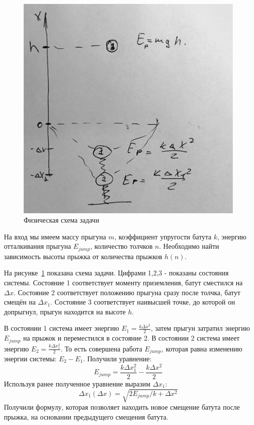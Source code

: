 \documentclass[12pt,a4paper,oneside]{extarticle}
\begin{document}
    \begin{figure}[h!]
        \center
        \includegraphics[scale=0.3]{scheme.jpg}
        \caption{Физическая схема задачи}
        \label{pic:scheme}
    \end{figure}

    На вход мы имеем массу прыгуна $m$, коэффициент упругости батута $k$, энергию отталкивания прыгуна $E_{jump}$, количество толчков $n$. Необходимо найти зависимость высоты прыжка от количества прыжков $h(n)$.

    На рисунке~\ref{pic:scheme} показана схема задачи. Цифрами 1,2,3 - показаны состояния системы. Состояние 1 соответствует моменту приземления, батут сместился на $\Delta x$. Состояние 2 соответствует положению прыгуна сразу после толчка, батут смещён на $\Delta x_1$. Состояние 3 соответствует наивысшей точке, до которой он допрыгнул, прыгун находится на высоте $h$.

    В состоянии 1 система имеет энергию $E_1=\frac{k\Delta x^2}{2}$, затем прыгун затратил энергию $E_{jump}$ на прыжок и переместился в состояние 2. В состоянии 2 система имеет энергию $E_2=\frac{k\Delta x_1^2}{2}$.
    То есть совершена работа $E_{jump}$, которая равна изменению энергии системы: $E_2-E_1$. Получили уравнение:
    $$E_{jump} = \frac{k\Delta x_1^2}{2} - \frac{k\Delta x^2}{2}$$
    Используя ранее полученное уравнение выразим $\Delta x_1$:
    $$\Delta x_1 (\Delta x) = \sqrt{2E_{jump}/k+\Delta x^2}$$
    Получили формулу, которая позволяет находить новое смещение батута после прыжка, на основании предыдущего смещения батута.
\end{document}
